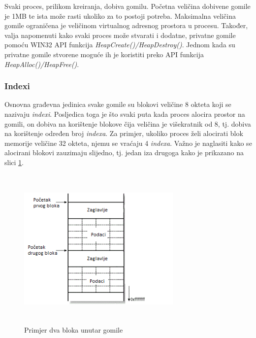 \documentclass[times, utf8, diplomski, numeric]{fer}
\begin{document}
Svaki proces, prilikom kreiranja, dobiva gomilu. Početna veličina
dobivene gomile je 1MB te ista može rasti ukoliko za to postoji
potreba. Maksimalna veličina gomile ograničena je veličinom				%
virtualnog adresnog prostora u procesu. Također, valja napomenuti kako svaki proces
može stvarati i dodatne, privatne gomile pomoću WIN32 API
funkcija \emph{HeapCreate()/HeapDestroy()}. Jednom kada su
privatne gomile stvorene moguće ih je koristiti preko API
funkcija \emph{HeapAlloc()/HeapFree()}.

\subsubsection{Indexi}
Osnovna građevna jedinica svake gomile su blokovi veličine 8
okteta koji se nazivaju \emph{indexi}. Posljedica toga je što
svaki puta kada proces alocira prostor na gomili, on dobiva na
korištenje blokove čija veličina je višekratnik od 8, tj. dobiva
na korištenje određen broj \emph{indexa}. Za primjer, ukoliko
proces želi alocirati blok memorije veličine 32 okteta, njemu se
vraćaju 4 \emph{indexa}. Važno je naglasiti kako se alocirani			%
blokovi zauzimaju slijedno, tj. jedan iza drugoga kako je
prikazano na slici \ref{fig:heap_2_allocated_blocks}.

\begin{figure}[!ht]
\centering
\setlength\fboxsep{0pt}
\setlength\fboxrule{0.5pt}
\includegraphics[width=8cm, height=8cm]{slike/heap_2_allocated_blocks}
\caption{Primjer dva bloka unutar gomile}
\label{fig:heap_2_allocated_blocks} 
\end{figure}
\end{document}
